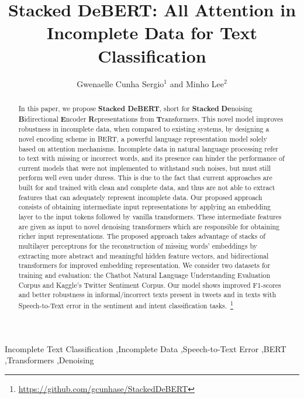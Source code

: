 \documentclass[review]{elsarticle}
\begin{document}
\begin{frontmatter}

\title{Stacked DeBERT: All Attention in Incomplete Data for Text Classification} 

\author{Gwenaelle Cunha Sergio$^{1}$ and Minho Lee$^{2}$}
\address{$^{1}$ School of Electronics and Electrical Engineering \\
         $^{2}$ Department of Artificial Intelligence \\ Kyungpook National University, Daegu, 41566, South Korea}








\begin{abstract}
In this paper, we propose \textbf{Stacked DeBERT}, short for \textbf{Stacked} \textbf{De}noising \textbf{B}idirectional \textbf{E}ncoder \textbf{R}epresentations from \textbf{T}ransformers. This novel model improves robustness in incomplete data, when compared to existing systems, by designing a novel encoding scheme in BERT, a powerful language representation model solely based on attention mechanisms. Incomplete data in natural language processing refer to text with missing or incorrect words, and its presence can hinder the performance of current models that were not implemented to withstand such noises, but must still perform well even under duress. This is due to the fact that current approaches are built for and trained with clean and complete data, and thus are not able to extract features that can adequately represent incomplete data. Our proposed approach consists of obtaining intermediate input representations by applying an embedding layer to the input tokens followed by vanilla transformers. These intermediate features are given as input to novel denoising transformers which are responsible for obtaining richer input representations. The proposed approach takes advantage of stacks of multilayer perceptrons for the reconstruction of missing words' embeddings by extracting more abstract and meaningful hidden feature vectors, and bidirectional transformers for improved embedding representation. We consider two datasets for training and evaluation: the Chatbot Natural Language Understanding Evaluation Corpus and Kaggle's Twitter Sentiment Corpus. Our model shows improved F1-scores and better robustness in informal/incorrect texts present in tweets and in texts with Speech-to-Text error in the sentiment and intent classification tasks.~\footnote{\url{https://github.com/gcunhase/StackedDeBERT}}
\end{abstract}

\begin{keyword}
Incomplete Text Classification \sep Incomplete Data \sep Speech-to-Text Error \sep BERT \sep Transformers \sep Denoising
\end{keyword}

\end{frontmatter}
\end{document}
